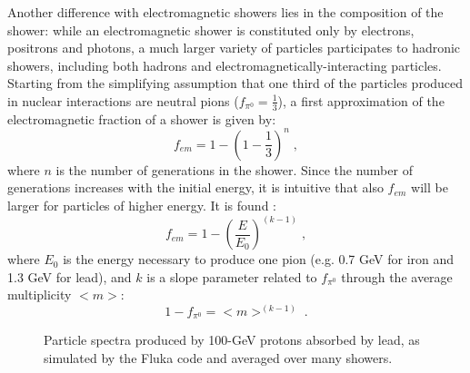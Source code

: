 Another difference with electromagnetic showers lies in the composition of the shower: while an electromagnetic shower is constituted only by electrons, positrons and photons, a much larger variety of particles participates to hadronic showers, including both hadrons and electromagnetically-interacting particles. Starting from the simplifying assumption that one third of the particles produced in nuclear interactions are neutral pions ($f_{\pi^0}=\frac{1}{3}$), a first approximation of the electromagnetic fraction of a shower is given by:
\begin{equation}
f_{em} = 1 - \left(1 - \frac{1}{3} \right)^n \; ,
\end{equation}
where $n$ is the number of generations in the shower. Since the number of generations increases with the initial energy, it is intuitive that also $f_{em}$ will be larger for particles of higher energy. It is found \cite{GABRIEL1994336}:
\begin{equation}
f_{em} = 1 - \left(\frac{E}{E_0}\right)^{\left( k-1 \right)} \; ,
\end{equation}
where $E_0$ is the energy necessary to produce one pion (e.g. 0.7 GeV for iron and 1.3 GeV for lead), and $k$ is a slope parameter related to $f_{\pi^0}$ through the average multiplicity $<m>$:
\begin{equation}
1-f_{\pi^0} = <m>^{\left( k-1 \right)} \;.
\end{equation}


\begin{figure}[ht]
\centering
{}
\caption{Particle spectra produced by 100-GeV protons absorbed by lead, as simulated by the Fluka code \cite{Ferrari:898301} and averaged over many showers.}
\label{fig:det:shower_had_spectra}
\end{figure}

